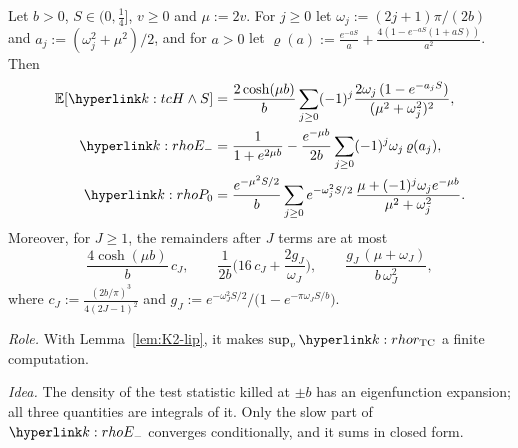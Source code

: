 \documentclass[11pt]{article}
\newcommand{\E}{\mathbb{E}}
\newcommand{\1}{\mathbf{1}}
\begin{document}
\begin{lemma}[series]\label{lem:K2-series}
Let $b>0$, $S\in(0,\frac14]$, $v\ge0$ and $\mu:=2v$. For $j\ge0$ let $\omega_j:=(2j+1)\pi/(2b)$ and $a_j:=(\omega_j^2+\mu^2)/2$, and for $a>0$ let
$\varrho(a):=\frac{e^{-aS}}a+\frac{4(1-e^{-aS}(1+aS))}{a^2}$. Then
\begin{align*}
\E[\kH\wedge S]&=\frac{2\cosh(\mu b)}{b}\sum_{j\ge0}(-1)^j\frac{2\omega_j\,(1-e^{-a_jS})}{(\mu^2+\omega_j^2)^2},\\
\kEm&=\frac1{1+e^{2\mu b}}-\frac{e^{-\mu b}}{2b}\sum_{j\ge0}(-1)^j\omega_j\,\varrho(a_j),\\
\kPo&=\frac{e^{-\mu^2S/2}}{b}\sum_{j\ge0}e^{-\omega_j^2S/2}\,\frac{\mu+(-1)^j\omega_je^{-\mu b}}{\mu^2+\omega_j^2} .
\end{align*}
Moreover, for $J\ge1$, the remainders after $J$ terms are at most
\[
\frac{4\cosh(\mu b)}{b}\,c_J,\qquad \frac1{2b}\Big(16\,c_J+\frac{2g_J}{\omega_J}\Big),\qquad \frac{g_J\,(\mu+\omega_J)}{b\,\omega_J^2},
\]
where $c_J:=\frac{(2b/\pi)^3}{4(2J-1)^2}$ and $g_J:=e^{-\omega_J^2S/2}/\big(1-e^{-\pi\omega_JS/b}\big)$.
\end{lemma}
\noindent\textit{Role.} With Lemma~\ref{lem:K2-lip}, it makes $\sup_v\kr$ a finite computation.

\noindent\textit{Idea.} The density of the test statistic killed at $\pm b$ has an eigenfunction expansion; all three quantities are integrals of it. Only the slow
part of $\kEm$ converges conditionally, and it sums in closed form.
\end{document}
